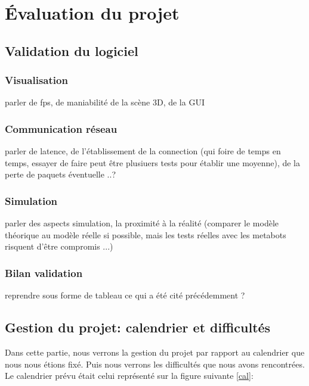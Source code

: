 \section{Évaluation du projet}
\subsection{Validation du logiciel} %
\subsubsection{Visualisation}
parler de fps, de maniabilité de la scène 3D, de la GUI

\subsubsection{Communication réseau}
parler de latence, de l'établissement de la connection (qui foire de temps en temps, essayer de faire peut être plusiuers tests pour établir une moyenne), de la perte de paquets éventuelle ..?

\subsubsection{Simulation}
parler des aspects simulation, la proximité à la réalité (comparer le modèle théorique au modèle réelle si possible, mais les tests réelles avec les metabots risquent d'être compromis ...)

\subsubsection{Bilan validation}
reprendre sous forme de tableau ce qui a été cité précédemment ?

\subsection{Gestion du projet: calendrier et difficultés}

Dans cette partie, nous verrons la gestion du projet par rapport au calendrier que nous nous étions fixé. Puis nous verrons les difficultés que nous avons rencontrées. Le calendrier prévu était celui représenté sur la figure suivante \ref{cal}:

